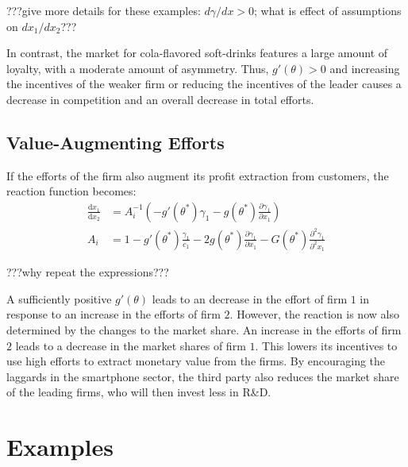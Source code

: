 \documentclass[a4paper, 11pt]{article}
\renewcommand{\d}{\text{d}}
\begin{document}
???give more details for these examples: $d\gamma/dx >0$; what is effect of assumptions on $dx_1/dx_{2}$???

In contrast, the market for cola-flavored soft-drinks features a large amount of loyalty, with a moderate amount of asymmetry. Thus, $g'(\theta)>0$ and increasing the incentives of the weaker firm or reducing the incentives of the leader causes a decrease in competition and an overall decrease in total efforts.

\subsection{Value-Augmenting Efforts}
If the efforts of the firm also augment its profit extraction from customers, the reaction function becomes:
\begin{align*}
\frac{\d x_1}{\d x_2} &= A_i^{-1} \left(-g'(\theta^*)\gamma_1 - g(\theta^*)\frac{\partial \gamma_1}{\partial x_1}\right)\\
A_i &= 1 - g'(\theta^*)\frac{\gamma_1}{c_1}-2g(\theta^*)\frac{\partial \gamma_1}{\partial x_1}-G(\theta^*)\frac{\partial^2 \gamma_1}{\partial^2 x_1}
\end{align*}

???why repeat the expressions???

A sufficiently positive $g'(\theta)$ leads to an decrease in the effort of firm $1$ in response to an increase in the efforts of firm $2$. However, the reaction is now also determined by the changes to the market share. An increase in the efforts of firm $2$ leads to a decrease in the market shares of firm $1$. This lowers its incentives to use high efforts to extract monetary value from the firms. By encouraging the laggards in the smartphone sector, the third party also reduces the market share of the leading firms, who will then invest less in R\&D.

\section{Examples}
\end{document}
